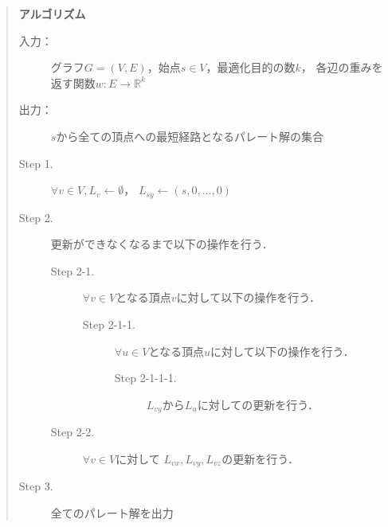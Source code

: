 \documentclass[12pt]{optlab-bachelor}
\begin{document}
\begin{quote}
  \textbf{アルゴリズム}
  \begin{description}
    \item[入力：] グラフ$G=(V,E)$，始点$s \in V$，最適化目的の数$k$，
    各辺の重みを返す関数$w : E \to \mathbb{R}^k$
    \item[出力：] $s$から全ての頂点への最短経路となるパレート解の集合
    \item[Step 1.] $\forall v \in V , L_v \leftarrow \emptyset$，
    $L_{sy} \leftarrow (s,0,\ldots,0)$
    \item[Step 2.] 更新ができなくなるまで以下の操作を行う．
    \begin{description}
      \item[Step 2-1.] $\forall v \in V$となる頂点$v$に対して以下の操作を行う．
      \begin{description}
        \item[Step 2-1-1.] $\forall u \in V$となる頂点$u$に対して以下の操作を行う．
        \begin{description}
          \item[Step 2-1-1-1.] $L_{vy}$から$L_u$に対しての更新を行う．
        \end{description}
      \end{description}
      \item[Step 2-2.] $\forall v \in V$に対して
      $L_{vx},L_{vy},L_{vz}$の更新を行う．
    \end{description}
    \item[Step 3.] 全てのパレート解を出力
  \end{description}
\end{quote}
\end{document}
